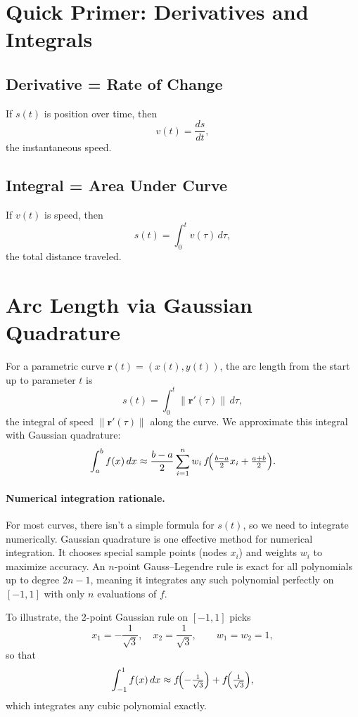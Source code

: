 \documentclass[11pt]{article}
\begin{document}
\section{Quick Primer: Derivatives and Integrals}

\subsection*{Derivative = Rate of Change}

If \(s(t)\) is position over time, then
\[
v(t) = \frac{ds}{dt},
\]
the instantaneous speed.

\subsection*{Integral = Area Under Curve}

If \(v(t)\) is speed, then
\[
s(t) = \int_{0}^{t} v(\tau)\,d\tau,
\]
the total distance traveled.

\section{Arc Length via Gaussian Quadrature}

For a parametric curve \(\mathbf r(t) = (x(t), y(t))\), the arc length from the start up to parameter \(t\) is 
\[
s(t) = \int_{0}^{t} \|\mathbf r'(\tau)\|\,d\tau,
\] 
the integral of speed \(\|\mathbf r'(\tau)\|\) along the curve. We approximate this integral with Gaussian quadrature:
\[
\int_a^b f(x)\,dx \approx \frac{b-a}{2}\sum_{i=1}^n w_i\,f\!\Bigl(\tfrac{b-a}{2}x_i + \tfrac{a+b}{2}\Bigr).
\]

\paragraph{Numerical integration rationale.}%
For most curves, there isn't a simple formula for \(s(t)\), so we need to integrate numerically. Gaussian quadrature is one effective method for numerical integration. It chooses special sample points (nodes \(x_i\)) and weights \(w_i\) to maximize accuracy. An \(n\)-point Gauss–Legendre rule is exact for all polynomials up to degree \(2n-1\), meaning it integrates any such polynomial perfectly on \([-1,1]\) with only \(n\) evaluations of \(f\).

To illustrate, the 2-point Gaussian rule on \([-1,1]\) picks
\[
x_1=-\frac{1}{\sqrt{3}},\quad x_2=\frac{1}{\sqrt{3}},
\qquad
w_1=w_2=1,
\]
so that
\[
\int_{-1}^{1} f(x)\,dx \approx f\!\Bigl(-\tfrac{1}{\sqrt{3}}\Bigr)
             +f\!\Bigl(\tfrac{1}{\sqrt{3}}\Bigr),
\]
which integrates any cubic polynomial exactly.
\end{document}

